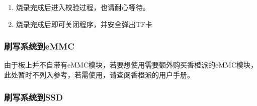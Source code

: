 \begin{enumerate}
\item
  烧录完成后进入校验过程，也请耐心等待。
\item
  烧录完成后即可关闭程序，并安全弹出TF卡
\end{enumerate}

\subsubsection{刷写系统到eMMC}\label{ux5237ux5199ux7cfbux7edfux5230emmc}

由于板上并不自带有eMMC模块，若要想使用需要额外购买香橙派的eMMC模块，此处暂时不列入参考，若需使用，请查阅香橙派的用户手册。

\subsubsection{刷写系统到SSD}\label{ux5237ux5199ux7cfbux7edfux5230ssd}

